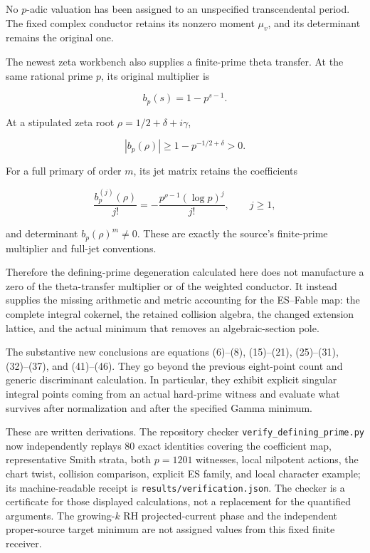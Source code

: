 No \(p\)-adic valuation has been assigned to an unspecified
transcendental period. The fixed complex conductor retains its nonzero
moment \(\mu_v\), and its determinant remains the original one.

The newest zeta workbench also supplies a finite-prime theta transfer.
At the same rational prime \(p\), its original multiplier is

\[
b_p(s)=1-p^{s-1}.
\]

At a stipulated zeta root \(\rho=1/2+\delta+i\gamma\),

\[
\boxed{
|b_p(\rho)|\ge1-p^{-1/2+\delta}>0.
}
\tag{47}
\]

For a full primary of order \(m\), its jet matrix retains the
coefficients

\[
\frac{b_p^{(j)}(\rho)}{j!}
=
-\frac{p^{\rho-1}(\log p)^j}{j!},
\qquad j\ge1,
\]

and determinant \(b_p(\rho)^m\ne0\). These are exactly the source's
finite-prime multiplier and full-jet conventions.

Therefore the defining-prime degeneration calculated here does not
manufacture a zero of the theta-transfer multiplier or of the weighted
conductor. It instead supplies the missing arithmetic and metric
accounting for the ES--Fable map: the complete integral cokernel, the
retained collision algebra, the changed extension lattice, and the
actual minimum that removes an algebraic-section pole.

The substantive new conclusions are equations (6)--(8), (15)--(21),
(25)--(31), (32)--(37), and (41)--(46). They go beyond the previous
eight-point count and generic discriminant calculation. In particular,
they exhibit explicit singular integral points coming from an actual
hard-prime witness and evaluate what survives after normalization and
after the specified Gamma minimum.

These are written derivations. The repository checker
\texttt{verify\_defining\_prime.py} now independently replays 80 exact
identities covering the coefficient map, representative Smith strata,
both \(p=1201\) witnesses, local nilpotent actions, the chart twist,
collision comparison, explicit ES family, and local character example;
its machine-readable receipt is \texttt{results/verification.json}. The
checker is a certificate for those displayed calculations, not a
replacement for the quantified arguments. The growing-\(k\) RH
projected-current phase and the independent proper-source target minimum
are not assigned values from this fixed finite receiver.
